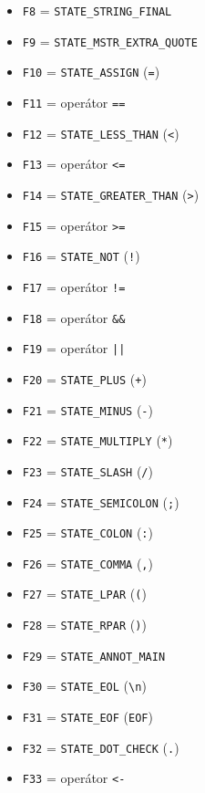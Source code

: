 \documentclass[]{ifjclass}
\begin{document}
        \hfill
        \begin{minipage}[t]{0.49\textwidth}
        \footnotesize
        \begin{itemize}\setlength{\itemsep}{1pt}\setlength{\parskip}{0pt}
            \item \texttt{F8} = \texttt{STATE\_STRING\_FINAL}
            \item \texttt{F9} = \texttt{STATE\_MSTR\_EXTRA\_QUOTE}
            \item \texttt{F10} = \texttt{STATE\_ASSIGN} (\texttt{=})
            \item \texttt{F11} = operátor \texttt{==}
            \item \texttt{F12} = \texttt{STATE\_LESS\_THAN} (\texttt{<})
            \item \texttt{F13} = operátor \texttt{<=}
            \item \texttt{F14} = \texttt{STATE\_GREATER\_THAN} (\texttt{>})
            \item \texttt{F15} = operátor \texttt{>=}
            \item \texttt{F16} = \texttt{STATE\_NOT} (\texttt{!})
            \item \texttt{F17} = operátor \texttt{!=}
            \item \texttt{F18} = operátor \texttt{\&\&}
            \item \texttt{F19} = operátor \texttt{||}
            \item \texttt{F20} = \texttt{STATE\_PLUS} (\texttt{+})
            \item \texttt{F21} = \texttt{STATE\_MINUS} (\texttt{-})
            \item \texttt{F22} = \texttt{STATE\_MULTIPLY} (\texttt{*})
            \item \texttt{F23} = \texttt{STATE\_SLASH} (\texttt{/})
            \item \texttt{F24} = \texttt{STATE\_SEMICOLON} (\texttt{;})
            \item \texttt{F25} = \texttt{STATE\_COLON} (\texttt{:})
            \item \texttt{F26} = \texttt{STATE\_COMMA} (\texttt{,})
            \item \texttt{F27} = \texttt{STATE\_LPAR} (\texttt{(})
            \item \texttt{F28} = \texttt{STATE\_RPAR} (\texttt{)})
            \item \texttt{F29} = \texttt{STATE\_ANNOT\_MAIN}
            \item \texttt{F30} = \texttt{STATE\_EOL} (\texttt{\textbackslash n})
            \item \texttt{F31} = \texttt{STATE\_EOF} (\texttt{EOF})
            \item \texttt{F32} = \texttt{STATE\_DOT\_CHECK} (\texttt{.})
            \item \texttt{F33} = operátor \texttt{<-}
        \end{itemize}
        \end{minipage}
        \normalsize
        \newpage
\end{document}
